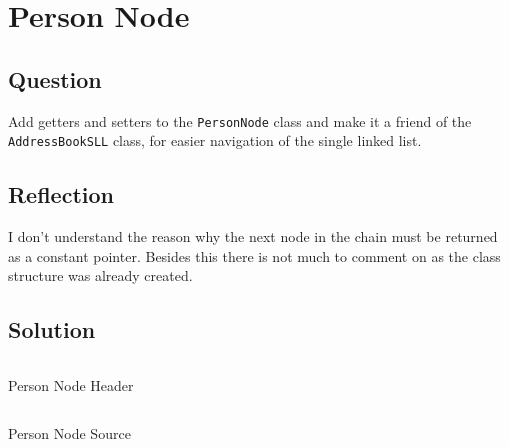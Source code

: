 \section{Person Node}
    \subsection*{Question}
        Add getters and setters to the \texttt{PersonNode} class
        and make it a friend of the \texttt{AddressBookSLL} class,
        for easier navigation of the single linked list.

    \subsection*{Reflection}
        I don't understand the reason why the next node in the chain
        must be returned as a constant pointer. Besides this there is
        not much to comment on as the class structure was already created.

    \subsection*{Solution}
        \begin{listing}[H]
            \inputminted[firstline=7, lastline=29]{cpp}{../Tasks/01-PersonNode/PersonNode.h}
            \caption{Person Node Header}
        \end{listing}

        \begin{listing}[H]
            \inputminted[firstline=12]{cpp}{../Tasks/01-PersonNode/PersonNode.cpp}
            \caption{Person Node Source}
        \end{listing}